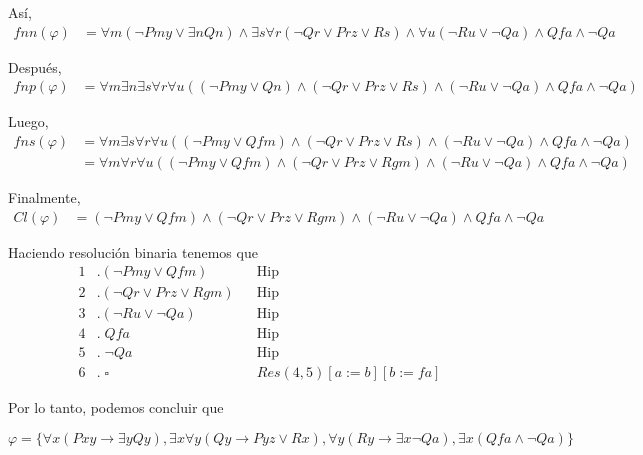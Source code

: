 \documentclass[letterpaper,12pt]{article}
\begin{document}
\begin{enumerate}
\begin{enumerate}
        Así,
        \begin{align*}
            fnn(\varphi) &=
            \forall m (\neg Pmy \lor \exists n Qn) \land 
            \exists s \forall r (\neg Qr \lor Prz \lor Rs) \land 
            \forall u (\neg Ru \lor \neg Qa) \land Qfa \land \neg Qa 
        \end{align*}

        Después, 
        \begin{align*}
            fnp(\varphi) &=
            \forall m \exists n \exists s \forall r \forall u
            ((\neg Pmy \lor Qn) \land (\neg Qr \lor Prz \lor Rs) \land 
            (\neg Ru \lor \neg Qa) \land Qfa \land \neg Qa)
        \end{align*}

        Luego, 
        \begin{align*}
            fns(\varphi) &= 
            \forall m \exists s \forall r \forall u
            ((\neg Pmy \lor Qfm) \land (\neg Qr \lor Prz \lor Rs) \land 
            (\neg Ru \lor \neg Qa) \land Qfa \land \neg Qa) \\
            &= 
            \forall m \forall r \forall u
            ((\neg Pmy \lor Qfm) \land (\neg Qr \lor Prz \lor Rgm) \land 
            (\neg Ru \lor \neg Qa) \land Qfa \land \neg Qa)
        \end{align*}

        Finalmente, 
        \begin{align*}
            Cl(\varphi) &=
            (\neg Pmy \lor Qfm) \land (\neg Qr \lor Prz \lor Rgm) \land 
            (\neg Ru \lor \neg Qa) \land Qfa \land \neg Qa
        \end{align*}

        Haciendo resolución binaria tenemos que 
        \begin{align*}
            1 &. (\neg Pmy \lor Qfm) 
            && \text{Hip} \\
            2 &. (\neg Qr \lor Prz \lor Rgm)
            && \text{Hip} \\
            3 &. (\neg Ru \lor \neg Qa)
            && \text{Hip} \\ 
            4 &. \; Qfa 
            && \text{Hip} \\
            5 &. \; \neg Qa
            && \text{Hip} \\
            6 &. \; \square
            && \text{$Res(4,5) [a := b][b := fa]$}
        \end{align*}

        \newpage
        Por lo tanto, podemos concluir que 
        \begin{center}
            $\varphi = \{\forall x (Pxy \rightarrow \exists y Qy), 
            \exists x \forall y (Qy \rightarrow Pyz \lor Rx),
            \forall y (Ry \rightarrow \exists x \neg Qa),
            \exists x (Qfa \land \neg Qa)\}$
        \end{center}
    \end{enumerate}


\end{enumerate}
\end{document}
